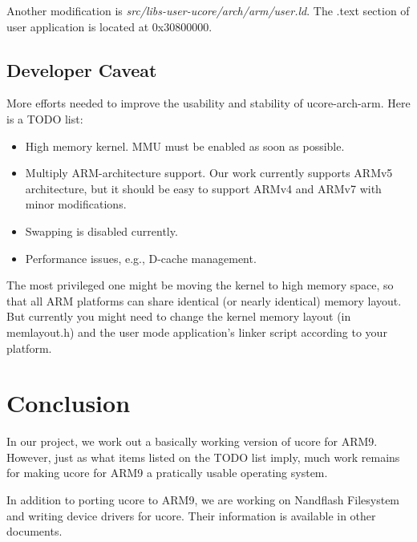 \documentclass[a4paper]{article}
\begin{document}
Another modification is \emph{src/libs-user-ucore/arch/arm/user.ld}.
The .text section of user application is located at  0x30800000.

\subsection{Developer Caveat}
More efforts needed to improve the usability and stability of ucore-arch-arm. Here is a TODO list:
\begin{itemize}
  \item High memory kernel. MMU must be enabled as soon as possible.
  \item Multiply ARM-architecture support. Our work currently supports
    ARMv5 architecture, but it should be easy to support ARMv4 and ARMv7
    with minor modifications.
  \item Swapping is disabled currently.
  \item Performance issues, e.g., D-cache management.
\end{itemize}

The most privileged one might be moving the kernel to high memory space, so that all ARM platforms
can share identical (or nearly identical) memory layout. But currently you might need to change
the kernel memory layout (in memlayout.h) and the user mode application's linker script 
according to your platform.


\section{Conclusion}
In our project, we work out a basically working version of ucore for ARM9.
However, just as what items listed on the TODO list imply,
much work remains for making ucore for ARM9 a pratically usable
operating system.

In addition to porting ucore to ARM9, we are working on Nandflash Filesystem and 
writing device drivers for ucore. Their information is available in other documents.
\end{document}
